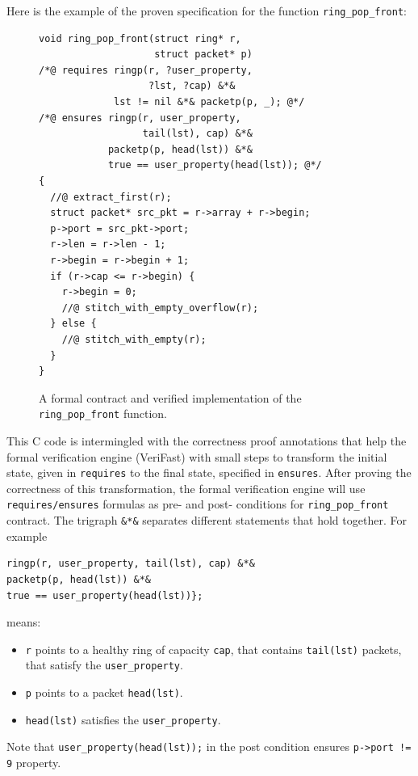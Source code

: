 \documentclass[letterpaper,twocolumn,10pt]{article}
\newcommand{\code}[1]{\lstinline{#1}}
\begin{document}
Here is the example of the proven specification for the function
\code{ring_pop_front}:

\begin{figure}[h!]
\begin{lstlisting}
void ring_pop_front(struct ring* r,
                    struct packet* p)
/*@ requires ringp(r, ?user_property,
                   ?lst, ?cap) &*&
             lst != nil &*& packetp(p, _); @*/
/*@ ensures ringp(r, user_property,
                  tail(lst), cap) &*&
            packetp(p, head(lst)) &*&
            true == user_property(head(lst)); @*/
{
  //@ extract_first(r);
  struct packet* src_pkt = r->array + r->begin;
  p->port = src_pkt->port;
  r->len = r->len - 1;
  r->begin = r->begin + 1;
  if (r->cap <= r->begin) {
    r->begin = 0;
    //@ stitch_with_empty_overflow(r);
  } else {
    //@ stitch_with_empty(r);
  }
}
\end{lstlisting}
  \caption{A formal contract and verified implementation of the \code{ring_pop_front} function.}
  \label{lst:contract}
\end{figure}

This C code is intermingled with the correctness proof annotations that help the
formal verification engine (VeriFast) with small steps to transform the initial
state, given in \code{requires} to the final state, specified in \code{ensures}.
After proving the correctness of this transformation, the formal verification
engine will use \code{requires/ensures} formulas as pre- and post- conditions
for \code{ring_pop_front} contract. The trigraph \code{&*&} separates different
statements that hold together. For example

\begin{lstlisting}
ringp(r, user_property, tail(lst), cap) &*&
packetp(p, head(lst)) &*&
true == user_property(head(lst))};
\end{lstlisting}
means:
\begin{itemize}
\item \code{r} points to a healthy ring of capacity \code{cap}, that contains
  \code{tail(lst)} packets, that satisfy the \code{user_property}.
\item \code{p} points to a packet \code{head(lst)}.
\item \code{head(lst)} satisfies the \code{user_property}.
\end{itemize}

Note that \code{user_property(head(lst));} in the post condition ensures
\code{p->port != 9} property.
\end{document}
